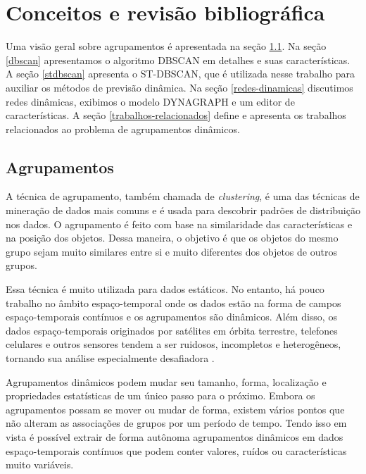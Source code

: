 \chapter{Conceitos e revisão bibliográfica}
\label{cap:estadodaarte}

Uma visão geral sobre agrupamentos é apresentada na seção \ref{agrupamentos}. Na seção \ref{dbscan} apresentamos o algoritmo DBSCAN em detalhes e suas características. A seção \ref{stdbscan} apresenta o ST-DBSCAN, que é utilizada nesse trabalho para auxiliar os métodos de previsão dinâmica. Na seção  \ref{redes-dinamicas}  discutimos redes dinâmicas, exibimos o modelo DYNAGRAPH e um editor de características. A seção  \ref{trabalhos-relacionados}  define e apresenta os trabalhos relacionados ao problema de agrupamentos dinâmicos.


\section{Agrupamentos}
\label{agrupamentos}

A técnica de agrupamento, também chamada de \textit{clustering}, é uma das técnicas de mineração de dados mais comuns e é usada para descobrir padrões de distribuição nos dados. O agrupamento é feito com base na similaridade das características e na posição dos objetos. Dessa maneira, o objetivo é que os objetos do mesmo grupo sejam muito similares entre si e muito diferentes dos objetos de outros grupos.

Essa técnica é muito utilizada para dados estáticos. No entanto, há pouco trabalho no âmbito espaço-temporal onde os dados estão na forma de campos espaço-temporais contínuos e os agrupamentos são dinâmicos. Além disso, os dados espaço-temporais originados por satélites em órbita terrestre, telefones celulares e outros sensores tendem a ser ruidosos, incompletos e heterogêneos, tornando sua análise especialmente desafiadora \cite{faghmous2013}.

Agrupamentos dinâmicos podem mudar seu tamanho, forma, localização e propriedades estatísticas de um único passo para o próximo. Embora os agrupamentos possam se mover ou mudar de forma, existem vários pontos que não alteram as associações de grupos por um período de tempo. Tendo isso em vista é possível extrair de forma autônoma agrupamentos dinâmicos em dados espaço-temporais contínuos que podem conter valores, ruídos ou características muito variáveis.

